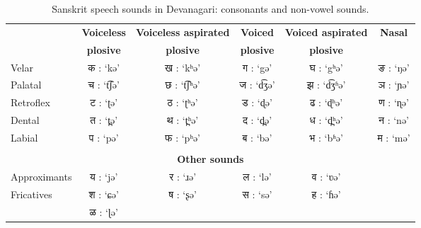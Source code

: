 \documentclass[10pt,a4paper]{article}
\begin{document}
\begin{table*}[ht]
	
	\begin{center}
		\begin{tabular}{|l|c|c|c|c|c|}
			\hline
			 & \textbf{Voiceless }&\textbf{Voiceless aspirated }&\textbf{Voiced }&\textbf{Voiced aspirated }&\textbf{Nasal}\\
			& \textbf{ plosive}&\textbf{ plosive}&\textbf{ plosive}&\textbf{ plosive}&\textbf{}
			\\
			\hline			
			Velar&क : `kə'	&ख : `kʰə'&	ग : `gə'&	घ : `gʰə'& ङ : `ŋə'\\\hline
			Palatal& च : `t͡ʃə'&	छ : `t͡ʃʰə'& ज : `d͡ʒə'&	झ : `d͡ʒʱə'& ञ : `ɲə'\\\hline
			Retroflex& ट : `ʈə'&	ठ : `ʈʰə'& 	ड : `ɖə'& ढ : `ɖʰə'&	ण : `ɳə'\\\hline
			Dental& त : `t̪ə'& 	थ : `t̪ʰə'&	द : `d̪ə'&		ध : `d̪ʰə'& न : `nə'\\\hline
			Labial & प : `pə'& 	फ : `pʰə'& ब : `bə'& 	भ : `bʱə'& म : `mə'\\\hline
			\multicolumn{6}{c}{ }\\\hline
			\multicolumn{6}{|c|}{\textbf{Other sounds}}\\\hline\hline
			Approximants& य : `jə'& 	र : `ɹə'&	ल : `lə'&	व : `ʋə'&\\\hline Fricatives&श : `ɕə'& ष : `ʂə'& 		स : `sə'& 	ह : `ɦə'&\\\hline&
			ळ : `ɭə'&\multicolumn{4}{c|}{ }	%
			\\\hline
		\end{tabular}
		\caption{Sanskrit speech sounds in Devanagari: consonants and non-vowel sounds.}
	\end{center}
	\label{cons}
\end{table*}
\end{document}

